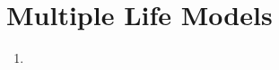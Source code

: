 \section{Multiple Life Models}
\label{sect:mult-life-models}
\begin{enumerate}
\item 
\end{enumerate}

